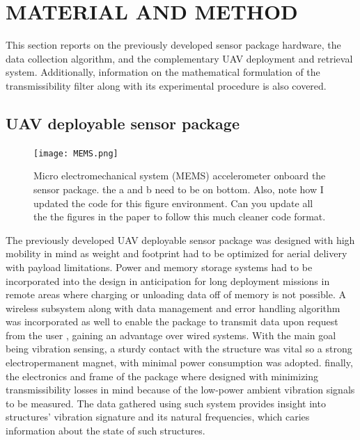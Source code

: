 \documentclass[]{spie}  %
\newcommand{\gr}[1]{\textcolor[rgb]{0.00,0.50,0.00}{#1}}
\begin{document}
	


	
	
	\section{MATERIAL AND METHOD}

This section reports on the previously developed sensor package hardware, the data collection algorithm, and the complementary UAV deployment and retrieval system. Additionally, information on the mathematical formulation of the transmissibility filter along with its experimental procedure is also covered.

		\subsection{UAV deployable sensor package}

	\begin{figure} [H]
	\centering
	\texttt{[image: MEMS.png]}
	\caption{Micro electromechanical system (MEMS) accelerometer onboard the sensor package. \gr{the a and b need to be on bottom. Also, note how I updated the code for this figure environment. Can you update all the the figures in the paper to follow this much cleaner code format.}}
	\label{fig:MEMS} 
	\end{figure} 	
	
The previously developed UAV deployable sensor package was designed with high mobility in mind as weight and footprint had to be optimized for aerial delivery with payload limitations. Power and memory storage systems had to be incorporated into the design in anticipation for long deployment missions in remote areas where charging or unloading data off of memory is not possible. A wireless subsystem along with data management and error handling algorithm was incorporated as well to enable the package to transmit data upon request from the user \cite{Sim2013}, gaining an advantage over wired systems.  With the main goal being vibration sensing, a sturdy contact with the structure was vital so a strong electropermanent magnet, with minimal power consumption was adopted. finally, the electronics and frame of the package where designed with minimizing transmissibility losses in mind because of the low-power ambient vibration signals to be measured. The data gathered using such system provides insight into structures' vibration signature and its natural frequencies, which caries information about the state of such structures\cite{Filippo2016}.  
\end{document}
